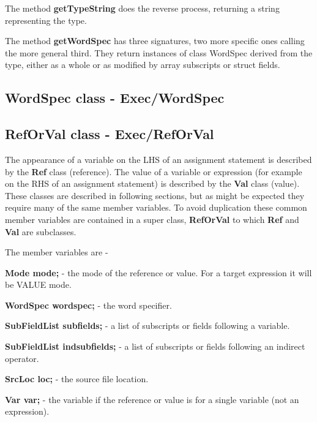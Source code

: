 \documentclass[10pt,a4paper,twoside,fleqn]{book}
\begin{document}
                The method {\bf getTypeString} does the reverse process, returning a
                string representing the type.

                The method {\bf getWordSpec} has three signatures, two more specific
                ones calling the more general third. They return instances of
                class WordSpec derived from the type, either as a whole or as
                modified by array subscripts or struct fields.


        \subsection{WordSpec class - Exec/WordSpec}\label{wordspec}


        


        \subsection{RefOrVal class - Exec/RefOrVal}

            The appearance of a variable on the LHS of an assignment statement is
            described by the {\bf Ref} class (reference). The value of a variable or
            expression (for example on the RHS of an assignment statement) is
            described by the {\bf Val} class (value). These classes are described in
            following sections, but as might be expected they require many of the
            same member variables. To avoid duplication these common member variables
            are contained in a super class, {\bf RefOrVal} to which {\bf Ref} and
            {\bf Val} are subclasses.

            The member variables are -

            {\bf Mode mode;} - the mode of the reference or value. For a target
            expression it will be VALUE mode.
            
            {\bf WordSpec wordspec;} - the word specifier.
            
            {\bf SubFieldList subfields;} - a list of subscripts or fields
            following a variable.
            
            {\bf SubFieldList indsubfields;} - a list of subscripts or fields
            following an indirect operator.
            
            {\bf SrcLoc loc;} - the source file location.
            
            {\bf Var var;} - the variable if the reference or value is for a
            single variable (not an expression).
            
\end{document}
